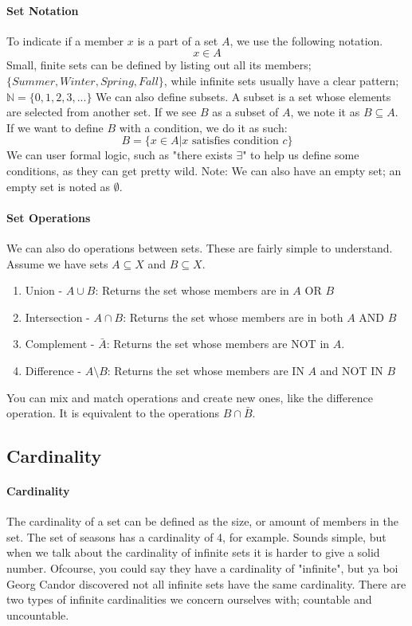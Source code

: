 \paragraph{Set Notation} To indicate if a member $x$ is a part of a set $A$, we use the following notation. \[ x \in A\] Small, finite sets can be defined by listing out all its members; $\{Summer, Winter, Spring, Fall\}$, while infinite sets usually have a clear pattern; $\mathbb{N} = \{0, 1, 2, 3, ...\}$ We can also define subsets. A subset is a set whose elements are selected from another set. If we see $B$ as a subset of $A$, we note it as $B \subseteq A$. If we want to define $B$ with a condition, we do it as such: \[ B = \{ x \in A | x \text{ satisfies condition } c\}\] We can user formal logic, such as "there exists $\exists$" to help us define some conditions, as they can get pretty wild. Note: We can also have an empty set; an empty set is noted as $\emptyset$.
\paragraph{Set Operations} We can also do operations between sets. These are fairly simple to understand. Assume we have sets $A \subseteq X$ and $B \subseteq X$. 
\begin{enumerate}
	\item Union - $A \cup B$: Returns the set whose members are in $A$ OR $B$
	\item Intersection - $A \cap B$: Returns the set whose members are in both $A$ AND $B$
	\item Complement - $\bar{A}$: Returns the set whose members are NOT in $A$.
	\item Difference - $A \setminus B$: Returns the set whose members are IN $A$ and NOT IN $B$
\end{enumerate}
You can mix and match operations and create new ones, like the difference operation. It is equivalent to the operations $B \cap \bar{B}$.

\subsection{Cardinality} 
\paragraph{Cardinality} The cardinality of a set can be defined as the size, or amount of members in the set. The set of seasons has a cardinality of 4, for example. Sounds simple, but when we talk about the cardinality of infinite sets it is harder to give a solid number. Ofcourse, you could say they have a cardinality of "infinite", but ya boi Georg Candor discovered not all infinite sets have the same cardinality. There are two types of infinite cardinalities we concern ourselves with; countable and uncountable.
